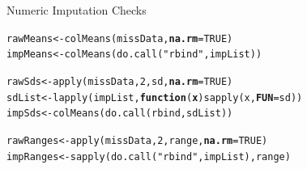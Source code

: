 \documentclass{beamer}\usepackage[]{graphicx}\usepackage[]{color}
\makeatletter
\newcommand{\hlnum}[1]{\textcolor[rgb]{0.69,0.494,0}{#1}}%
\newcommand{\hlstr}[1]{\textcolor[rgb]{0.749,0.012,0.012}{#1}}%
\newcommand{\hlstd}[1]{\textcolor[rgb]{0,0,0}{#1}}%
\newcommand{\hlkwa}[1]{\textcolor[rgb]{0,0,0}{\textbf{#1}}}%
\newcommand{\hlkwb}[1]{\textcolor[rgb]{0,0.341,0.682}{#1}}%
\newcommand{\hlkwc}[1]{\textcolor[rgb]{0,0,0}{\textbf{#1}}}%
\newcommand{\hlkwd}[1]{\textcolor[rgb]{0.004,0.004,0.506}{#1}}%
\newenvironment{kframe}{%
 \def\at@end@of@kframe{}%
 \ifinner\ifhmode%
  \def\at@end@of@kframe{\end{minipage}}%
  \begin{minipage}{\columnwidth}%
 \fi\fi%
 \def\FrameCommand##1{\hskip\@totalleftmargin \hskip-\fboxsep
 \colorbox{shadecolor}{##1}\hskip-\fboxsep
     \hskip-\linewidth \hskip-\@totalleftmargin \hskip\columnwidth}%
 \MakeFramed {\advance\hsize-\width
   \@totalleftmargin\z@ \linewidth\hsize
   \@setminipage}}%
 {\par\unskip\endMakeFramed%
 \at@end@of@kframe}
\newenvironment{knitrout}{}{} %
\makeatother
\begin{document}
\begin{frame}[fragile]{Numeric Imputation Checks}
  


\begin{knitrout}\footnotesize
{}\color{fgcolor}\begin{kframe}
\begin{alltt}
\hlstd{rawMeans} \hlkwb{<-} \hlkwd{colMeans}\hlstd{(missData,} \hlkwc{na.rm} \hlstd{=} \hlnum{TRUE}\hlstd{)}
\hlstd{impMeans} \hlkwb{<-} \hlkwd{colMeans}\hlstd{(}\hlkwd{do.call}\hlstd{(}\hlstr{"rbind"}\hlstd{, impList))}

\hlstd{rawSds} \hlkwb{<-} \hlkwd{apply}\hlstd{(missData,} \hlnum{2}\hlstd{, sd,} \hlkwc{na.rm} \hlstd{=} \hlnum{TRUE}\hlstd{)}
\hlstd{sdList} \hlkwb{<-} \hlkwd{lapply}\hlstd{(impList,} \hlkwa{function}\hlstd{(}\hlkwc{x}\hlstd{)} \hlkwd{sapply}\hlstd{(x,} \hlkwc{FUN} \hlstd{= sd))}
\hlstd{impSds} \hlkwb{<-} \hlkwd{colMeans}\hlstd{(}\hlkwd{do.call}\hlstd{(rbind, sdList))}

\hlstd{rawRanges} \hlkwb{<-} \hlkwd{apply}\hlstd{(missData,} \hlnum{2}\hlstd{, range,} \hlkwc{na.rm} \hlstd{=} \hlnum{TRUE}\hlstd{)}
\hlstd{impRanges} \hlkwb{<-} \hlkwd{sapply}\hlstd{(}\hlkwd{do.call}\hlstd{(}\hlstr{"rbind"}\hlstd{, impList), range)}
\end{alltt}
\end{kframe}
\end{knitrout}

\end{frame}

\end{document}
